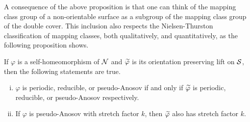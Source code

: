 A consequence of the above proposition is that one can think of the mapping class group of a
non-orientable surface as a subgroup of the mapping class group of the double cover. This inclusion
also respects the Nielsen-Thurston classification of mapping classes, both qualitatively, and
quantitatively, as the following proposition shows.
\begin{prop}
  \label{prop:2}
  If $\varphi$ is a self-homeomorphism of $\mathcal{N}$ and $\widetilde{\varphi}$ is its orientation preserving lift on $\mathcal{S}$, then
  the following statements are true.
  \begin{enumerate}[(i)]
  \item $\varphi$ is periodic, reducible, or pseudo-Anosov if and only if $\widetilde{\varphi}$ is periodic, reducible, or pseudo-Anosov
    respectively.
  \item If $\varphi$ is pseudo-Anosov with stretch factor $k$, then $\widetilde{\varphi}$ also has stretch factor $k$.
  \end{enumerate}
\end{prop}
